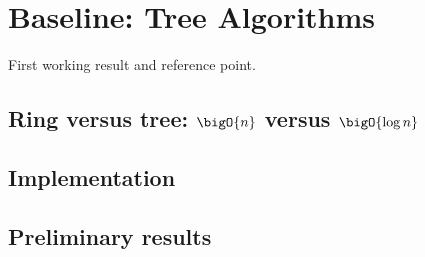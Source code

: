 \chapter{Baseline: Tree Algorithms}\label{ch:tree}

First working result and reference point.

\section{Ring versus tree: $\bigO{n}$ versus $\bigO{\log n}$}
\section{Implementation}
\section{Preliminary results}
